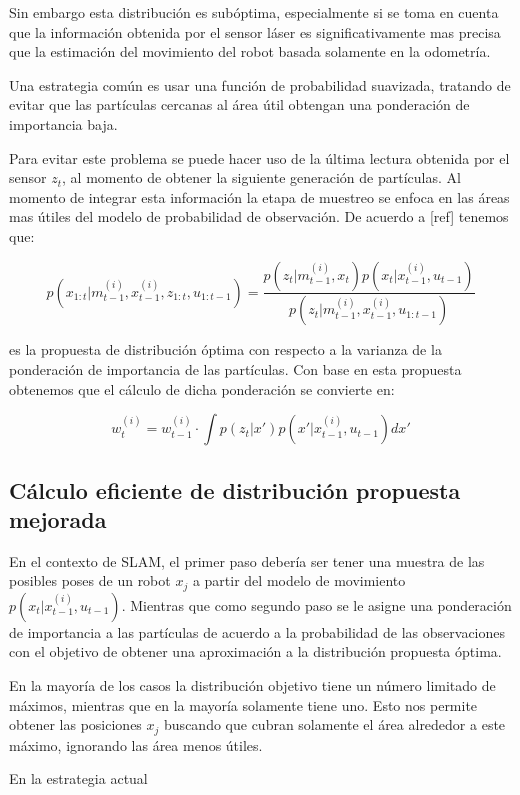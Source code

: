 \documentclass[10pt,a4paper]{article}
\begin{document}
Sin embargo esta distribución es subóptima, especialmente si se toma en cuenta que la información obtenida por el sensor láser es significativamente mas precisa que la estimación del movimiento del robot basada solamente en la odometría. 

Una estrategia común es usar una función de probabilidad suavizada, tratando de evitar que las partículas cercanas al área útil obtengan una ponderación de importancia baja.

Para evitar este problema se puede hacer uso de la última lectura obtenida por el sensor $ z_{t} $, al momento de obtener la siguiente generación de partículas. Al momento de integrar esta información la etapa de muestreo se enfoca en las áreas mas útiles del modelo de probabilidad de observación. De acuerdo a [ref] tenemos que:

	\begin{equation}
		p(x_{1:t} | m_{t-1}^{(i)}, x_{t-1}^{(i)}, z_{1:t},u_{1:t-1}) =
			\frac{p(z_{t} | m_{t-1}^{(i)}, x_{t}) p(x_{t} | x_{t-1}^{(i)}, u_{t-1}) }
			{p(z_{t} | m_{t-1}^{(i)}, x_{t-1}^{(i)}, u_{1:t-1})}
	\end{equation}

es la propuesta de distribución óptima con respecto a la varianza de la ponderación de importancia de las partículas. Con base en esta propuesta obtenemos que el cálculo de dicha ponderación se convierte en:

	\begin{equation}
		w_{t}^{(i)} = 
			w_{t-1}^{(i)} \cdot \int p(z_{t}|x') p(x' | x_{t-1}^{(i)}, u_{t-1})dx'
	\end{equation}
	
\subsection{Cálculo eficiente de distribución propuesta mejorada}

En el contexto de SLAM, el primer paso debería ser tener una muestra de las posibles poses de un robot $ x_{j} $ a partir del modelo de movimiento $ p(x_{t} | x_{t-1}^{(i)}, u_{t-1}) $. Mientras que como segundo paso se le asigne una ponderación de importancia a las partículas de acuerdo a la probabilidad de las observaciones con el objetivo de obtener una aproximación a la distribución propuesta óptima.

En la mayoría de los casos la distribución objetivo tiene un número limitado de máximos, mientras que en la mayoría solamente tiene uno. Esto nos permite obtener las posiciones $ x_{j} $ buscando que cubran solamente el área alrededor a este máximo, ignorando las área menos útiles.

En la estrategia actual 
\end{document}
